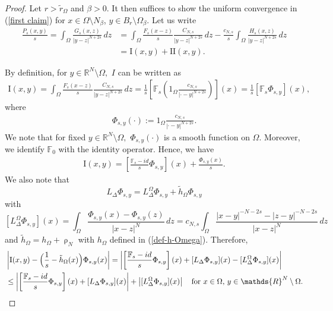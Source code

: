 \documentclass[notitlepage,11pt,reqno]{amsart}
\theoremstyle{definition}
\numberwithin{equation}{section}
\newcommand{\RR}{\mathds{R}}
\begin{document}
\begin{proof}
Let $r>\tilde r_\Omega$ and $\beta>0$. It then suffices to show the uniform convergence in (\ref{first claim}) for $x \in \Omega \setminus N_\beta$, $y \in B_r \setminus\Omega_{\beta}$. Let us write
\begin{align*}
    \frac{P_s(x, y)}{s}= \int_{\Omega}\frac{G_s(x, z)}{|y-z|^{N+2s}}\,dz&=\int_{\Omega}\frac{F_s(x-z)}{s}\frac{C_{N,s}}{|y-z|^{N+2s}}\,dz-\frac{c_{N, s}}{s}\int_{\Omega}\frac{H_s(x, z)}{|y-z|^{N+2s}}\,dz\\
    &=\mathrm I (x, y)+\mathrm {II}(x, y).
\end{align*}

\vspace{.5cm}
 By definition, for $y \in \RR^N\setminus \Omega,$ $I$ can be written as
\begin{align*}
    \mathrm{I}(x,y)=\int_{\Omega}\frac{F_s(x-z)}{s}\frac{C_{N,s}}{|y-z|^{N+2s}}\,dz=\frac{1}{s}\left[\mathbb{F}_s \left(1_{\Omega}\frac{c_{N, s}}{|\cdot-y|^{N+2s}}\right)\right](x)=\frac{1}{s}\left[\mathbb{F}_s \Phi_{s, y}\right](x),
\end{align*}
where 
\begin{align*}
    \Phi_{s, y}(\cdot):=1_{\Omega}\frac{c_{N, s}}{|\cdot-y|^{N+2s}}.
\end{align*}
We note that for fixed $y \in \RR^N\setminus \Omega,$ $\Phi_{s, y}(\cdot)$ is a smooth function on $\Omega$. Moreover, we identify $\mathbb{F}_0$ with the identity operator. Hence, we have
\begin{align*}
    \mathrm{I}(x,y)=\left[\frac{\mathbb{F}_s-id}{s} \Phi_{s, y}\right](x)+\frac{\Phi_{s, y}(x)}{s}.
\end{align*}
We also note that
$$
L_{\Delta}\Phi_{s, y} = L_\Delta^\Omega \Phi_{s,y} + \tilde h_\Omega \Phi_{s,y}
$$
with
$$
[L_\Delta^\Omega \Phi_{s,y}](x) = \int_{\Omega}\frac{\Phi_{s,y}(x)-\Phi_{s,y}(z)}{|x-z|^N}\,dz
= c_{N,s}\int_{\Omega}\frac{|x -y|^{-N-2s}-|z-y|^{-N-2s}}{|x-z|^N}\,dz
$$
and $\tilde h_\Omega = h_{\Omega}+\uprho_N$ with $h_\Omega$ defined in (\ref{def-h-Omega}). Therefore,
\begin{align}
  &\left|\mathrm{I}(x,y)- \Bigl(\frac{1}{s} - \tilde h_\Omega(x)\Bigr)\Phi_{s,y}(x) \right| = \left| \left[\frac{\mathbb{F}_s-id}{s} \Phi_{s, y}\right](x) + [L_{\Delta}\Phi_{s, y}](x)- [L_{\Delta}^\Omega\Phi_{s, y}](x) \right| \nonumber\\
&\leq \left|\left[\frac{\mathbb{F}_s-id}{s} \Phi_{s, y}\right](x)+[L_{\Delta}\Phi_{s, y}](x)\right|+\left|[L_{\Delta}^\Omega \Phi_{s, y}](x)\right|\quad \text{for $x \in \Omega$, $y \in \RR^N \setminus \Omega$.} \label{Eq1.10}

\end{align}
\end{proof}
\end{document}

